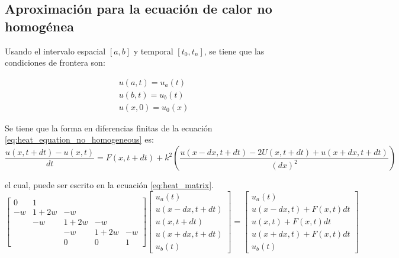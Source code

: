 \subsection{Aproximación para la ecuación de calor no homogénea}

Usando el intervalo espacial $[a,b]$ y temporal $[t_0,t_n]$, se tiene que las condiciones de frontera son:

\begin{align}
    u(a,t) = u_a(t)  \nonumber \\
    u(b,t) = u_b(t)            \\
    u(x,0) = u_0(x) \nonumber
\end{align}

Se tiene que la forma en diferencias finitas de la ecuación \ref{eq:heat_equation_no_homogeneous} es:
\small
\begin{equation}
    \frac{u(x,t+dt) -u(x,t)}{dt} = F(x,t+dt) + k^2 \left (\frac{u(x-dx,t+dt)-2U(x,t+dt)+u(x+dx,t+dt)}{(dx)^2} \right )
\end{equation}
\normalsize

el cual, puede ser escrito en la ecuación \ref{eq:heat_matrix}.
\small
\begin{equation}
    \begin{bmatrix}
        0  & 1    &                  \\
        -w & 1+2w & -w               \\
           & -w   & 1+2w & -w        \\
           &      & -w   & 1+2w & -w \\
           &      & 0    & 0    & 1
    \end{bmatrix}
    \begin{bmatrix}
        u_a(t)       \\
        u(x-dx,t+dt) \\
        u(x,t+dt)    \\
        u(x+dx,t+dt) \\
        u_b(t)
    \end{bmatrix} = \begin{bmatrix}
        u_a(t)             \\
        u(x-dx,t)+F(x,t)dt \\
        u(x,t)+F(x,t)dt    \\
        u(x+dx,t)+F(x,t)dt \\
        u_b(t)
    \end{bmatrix} \label{eq:heat_matrix}
\end{equation}
\normalsize


